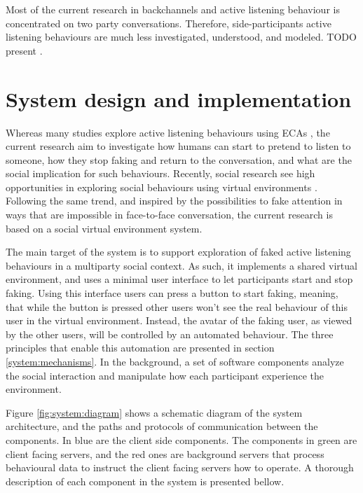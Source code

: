 \documentclass[]{simple-thesis}
\begin{document}
Most of the current research in backchannels and active listening behaviour is concentrated on two party conversations.
Therefore, side-participants active listening behaviours are much less investigated, understood, and modeled.
TODO present \citep{Matsusaka2003, Fujie2009}.


\chapter{System design and implementation}\label{system_design_and_implementation}

Whereas many studies explore active listening behaviours using ECAs \citep{Nishimura2007, Bevacqua2008, Gratch2007, Huang2011, Lee2006, Poppe2013}, the current research aim to investigate how humans can start to pretend to listen to someone, how they stop faking and return to the conversation, and what are the social implication for such behaviours.
Recently, social research see high opportunities in exploring social behaviours using virtual environments \citep{Bailenson2008}.
Following the same trend, and inspired by the possibilities to fake attention in ways that are impossible in face-to-face conversation, the current research is based on a social virtual environment system.

The main target of the system is to support exploration of faked active listening behaviours in a multiparty social context.
As such, it implements a shared virtual environment, and uses a minimal user interface to let participants start and stop faking.
Using this interface users can press a button to start faking, meaning, that while the button is pressed other users won't see the real behaviour of this user in the virtual environment.
Instead, the avatar of the faking user, as viewed by the other users, will be controlled by an automated behaviour.
The three principles that enable this automation are presented in section \ref{system:mechanisms}.
In the background, a set of software components analyze the social interaction and manipulate how each participant experience the environment.

Figure \ref{fig:system:diagram} shows a schematic diagram of the system architecture, and the paths and protocols of communication between the components.
In blue are the client side components.
The components in green are client facing servers, and the red ones are background servers that process behavioural data to instruct the client facing servers how to operate.
A thorough description of each component in the system is presented bellow.
\end{document}
